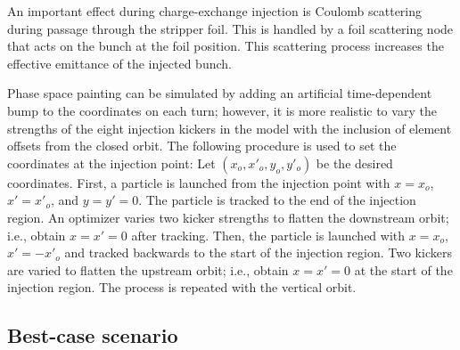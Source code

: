 An important effect during charge-exchange injection is Coulomb scattering during passage through the stripper foil. This is handled by a foil scattering node that acts on the bunch at the foil position. This scattering process increases the effective emittance of the injected bunch.

Phase space painting can be simulated by adding an artificial time-dependent bump to the coordinates on each turn; however, it is more realistic to vary the strengths of the eight injection kickers in the model with the inclusion of element offsets from the closed orbit. The following procedure is used to set the coordinates at the injection point: Let $(x_o, x'_o, y_o, y'_o)$ be the desired coordinates. First, a particle is launched from the injection point with $x = x_o$, $x' = x'_o$, and $y = y' = 0$. The particle is tracked to the end of the injection region. An optimizer varies two kicker strengths to flatten the downstream orbit; i.e., obtain $x = x' = 0$ after tracking. Then, the particle is launched with $x = x_o$, $x' = -x'_o$ and tracked backwards to the start of the injection region. Two kickers are varied to flatten the upstream orbit; i.e., obtain $x = x' = 0$ at the start of the injection region. The process is repeated with the vertical orbit.


\subsection{Best-case scenario}

